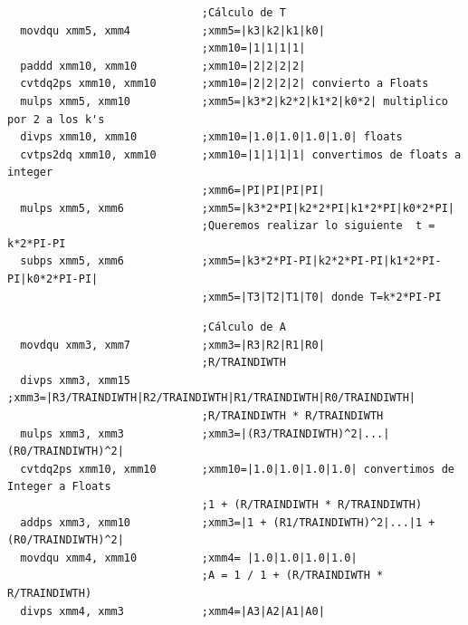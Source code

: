 \begin{codesnippet}
\begin{verbatim}
                              ;Cálculo de T
  movdqu xmm5, xmm4           ;xmm5=|k3|k2|k1|k0|
                              ;xmm10=|1|1|1|1| 
  paddd xmm10, xmm10          ;xmm10=|2|2|2|2|
  cvtdq2ps xmm10, xmm10       ;xmm10=|2|2|2|2| convierto a Floats
  mulps xmm5, xmm10           ;xmm5=|k3*2|k2*2|k1*2|k0*2| multiplico por 2 a los k's
  divps xmm10, xmm10          ;xmm10=|1.0|1.0|1.0|1.0| floats
  cvtps2dq xmm10, xmm10       ;xmm10=|1|1|1|1| convertimos de floats a integer
                              ;xmm6=|PI|PI|PI|PI|
  mulps xmm5, xmm6            ;xmm5=|k3*2*PI|k2*2*PI|k1*2*PI|k0*2*PI|
                              ;Queremos realizar lo siguiente  t = k*2*PI-PI
  subps xmm5, xmm6            ;xmm5=|k3*2*PI-PI|k2*2*PI-PI|k1*2*PI-PI|k0*2*PI-PI|
                              ;xmm5=|T3|T2|T1|T0| donde T=k*2*PI-PI 
\end{verbatim}
\end{codesnippet}
\begin{codesnippet}
\begin{verbatim}
                              ;Cálculo de A
  movdqu xmm3, xmm7           ;xmm3=|R3|R2|R1|R0|
                              ;R/TRAINDIWTH
  divps xmm3, xmm15           ;xmm3=|R3/TRAINDIWTH|R2/TRAINDIWTH|R1/TRAINDIWTH|R0/TRAINDIWTH|
                              ;R/TRAINDIWTH * R/TRAINDIWTH
  mulps xmm3, xmm3            ;xmm3=|(R3/TRAINDIWTH)^2|...|(R0/TRAINDIWTH)^2|
  cvtdq2ps xmm10, xmm10       ;xmm10=|1.0|1.0|1.0|1.0| convertimos de Integer a Floats
                              ;1 + (R/TRAINDIWTH * R/TRAINDIWTH)
  addps xmm3, xmm10           ;xmm3=|1 + (R1/TRAINDIWTH)^2|...|1 + (R0/TRAINDIWTH)^2|
  movdqu xmm4, xmm10          ;xmm4= |1.0|1.0|1.0|1.0|
                              ;A = 1 / 1 + (R/TRAINDIWTH * R/TRAINDIWTH)
  divps xmm4, xmm3            ;xmm4=|A3|A2|A1|A0|
\end{verbatim}
\end{codesnippet}


